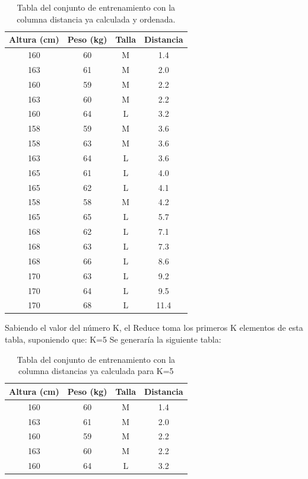 	\begin{table}[H]
		\begin{center}
			\label{tab:tablaKNNDistancias}
			\begin{tabular}{c|c|c|c}
				\textbf{Altura (cm)} & \textbf{Peso (kg)} & \textbf{Talla} & \textbf{Distancia}\\
				\hline
				160 & 60 & M & 1.4\\
				163 & 61 & M & 2.0\\
				160 & 59 & M & 2.2\\
				163 & 60 & M & 2.2\\
				160 & 64 & L & 3.2\\
				158 & 59 & M & 3.6\\
				158 & 63 & M & 3.6\\
				163 & 64 & L & 3.6\\
				165 & 61 & L & 4.0\\
				165 & 62 & L & 4.1\\
				158 & 58 & M & 4.2\\
				165 & 65 & L & 5.7\\
				168 & 62 & L & 7.1\\
				168 & 63 & L & 7.3\\
				168 & 66 & L & 8.6\\
				170 & 63 & L & 9.2\\
				170 & 64 & L & 9.5\\
				170 & 68 & L & 11.4\\
			\end{tabular}
		\end{center}
		\caption{Tabla del conjunto de entrenamiento con la columna distancia ya calculada y ordenada.}
	\end{table}  
	Sabiendo el valor del número K, el Reduce toma los primeros K elementos de esta tabla, suponiendo que:
	K=5
	Se generaría la siguiente tabla:
	\begin{table}[H]
		\begin{center}
			\label{tab:tablaKNNDistanciask}
			\begin{tabular}{c|c|c|c}
				\textbf{Altura (cm)} & \textbf{Peso (kg)} & \textbf{Talla} & \textbf{Distancia}\\
				\hline
				160 & 60 & M & 1.4\\
				163 & 61 & M & 2.0\\
				160 & 59 & M & 2.2\\
				163 & 60 & M & 2.2\\
				160 & 64 & L & 3.2\\
			\end{tabular}
		\end{center}
		\caption{Tabla del conjunto de entrenamiento con la columna distancias ya calculada para K=5}
	\end{table}
